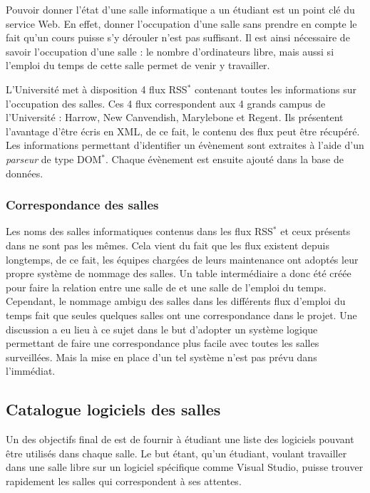 Pouvoir donner l'\'etat d'une salle informatique a un \'etudiant est un point cl\'e du service Web.
En effet, donner l'occupation d'une salle sans prendre en compte le fait qu'un cours puisse s'y d\'erouler n'est pas suffisant.
Il est ainsi n\'ecessaire de savoir l'occupation d'une salle : le nombre d'ordinateurs libre, mais aussi si l'emploi du temps de cette salle permet de venir y travailler.

L'Universit\'e met \`a disposition 4 flux RSS$^*$ contenant toutes les informations sur l'occupation des salles.
Ces 4 flux correspondent aux 4 grands campus de l'Universit\'e : Harrow, New Canvendish, Marylebone et Regent.
Ils pr\'esentent l'avantage d'\^etre \'ecris en XML, de ce fait, le contenu des flux peut \^etre r\'ecup\'er\'e.
Les informations permettant d'identifier un \'ev\`enement sont extraites \`a l'aide d'un \textit{parseur} de type DOM$^*$.
Chaque \'ev\`enement est ensuite ajout\'e dans la base de donn\'ees.

\subsubsection{Correspondance des salles}

Les noms des salles informatiques contenus dans les flux RSS$^*$ et ceux pr\'esents dans {\YuukouII} ne sont pas les m\^emes.
Cela vient du fait que les flux existent depuis longtemps, de ce fait, les \'equipes charg\'ees de leurs maintenance ont adopt\'es leur propre syst\`eme de nommage des salles.
Un table interm\'ediaire a donc \'et\'e cr\'e\'ee pour faire la relation entre une salle de {\YuukouII} et une salle de l'emploi du temps.
Cependant, le nommage ambigu des salles dans les diff\'erents flux d'emploi du temps fait que seules quelques salles ont une correspondance dans le projet.
Une discussion a eu lieu \`a ce sujet dans le but d'adopter un syst\`eme logique permettant de faire une correspondance plus facile avec toutes les salles surveill\'ees.
Mais la mise en place d'un tel syst\`eme n'est pas pr\'evu dans l'imm\'ediat.

\subsection{Catalogue logiciels des salles}
\label{section:catalogueLogiciel}

Un des objectifs final de {\YuukouII} est de fournir \`a \'etudiant une liste des logiciels pouvant \^etre utilis\'es dans chaque salle.
Le but \'etant, qu'un \'etudiant, voulant travailler dans une salle libre sur un logiciel sp\'ecifique comme Visual Studio, puisse trouver rapidement les salles qui correspondent \`a ses attentes.


